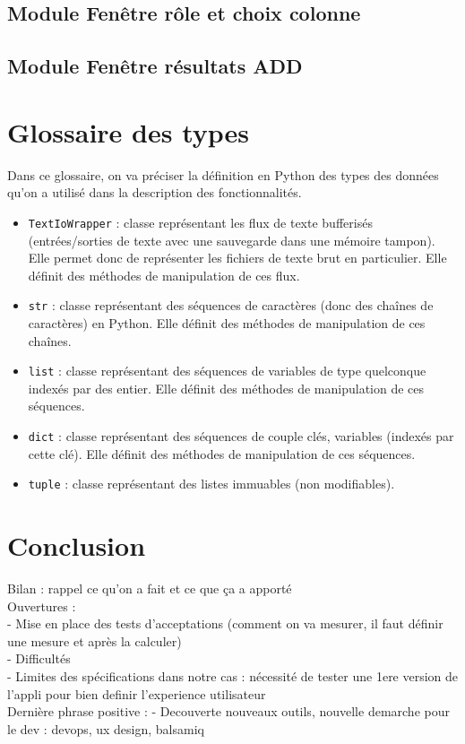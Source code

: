 		\subsection{Module Fenêtre rôle et choix colonne}

		\subsection{Module Fenêtre résultats ADD}
	
	\section{Glossaire des types}
	
	Dans ce glossaire, on va préciser la définition en Python des types des données qu'on a utilisé dans la description des fonctionnalités.
	\begin{itemize}
		\item \lstinline!TextIoWrapper! : classe représentant les flux de texte bufferisés (entrées/sorties de texte avec une sauvegarde dans une mémoire tampon). Elle permet donc de représenter les fichiers de texte brut en particulier. Elle définit des méthodes de manipulation de ces flux.
		\item \lstinline!str! : classe représentant des séquences de caractères (donc des chaînes de caractères) en Python. Elle définit des méthodes de manipulation de ces chaînes.
		\item \lstinline!list! : classe représentant des séquences de variables de type quelconque indexés par des entier. Elle définit des méthodes de manipulation de ces séquences.		
		\item \lstinline!dict! : classe représentant des séquences de couple clés, variables (indexés par cette clé). Elle définit des méthodes de manipulation de ces séquences.		
		\item \lstinline!tuple! : classe représentant des listes immuables (non modifiables).
	\end{itemize}
	
	\section*{Conclusion}
		Bilan : rappel ce qu'on a fait et ce que ça a apporté\\
		Ouvertures :\\
			- Mise en place des tests d'acceptations (comment on va mesurer, il faut définir une mesure et après la calculer)\\
			- Difficultés\\
			- Limites des spécifications dans notre cas : nécessité de tester une 1ere version de l'appli pour bien definir l'experience utilisateur\\
		Dernière phrase positive :
			- Decouverte nouveaux outils, nouvelle demarche pour le dev : devops, ux design, balsamiq
		

